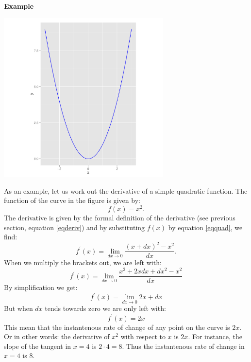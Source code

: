 \documentclass[a4paper]{report}
\begin{document}
\begin{mdframed}[backgroundcolor=exampcol]
\textbf{Example}\\
\begin{center}
\includegraphics[width=0.65\textwidth]{der_graphquad.pdf}\\
\end{center}
As an example, let us work out the derivative of a simple quadratic function. The function of the curve in the figure is given by: 
\begin{equation}
f(x)=x^2.
\label{eqquad}
\end{equation}
The derivative is given by the formal definition of the derivative (see previous section, equation \ref{eqderiv}) and by substituting $f(x)$ by equation \ref{eqquad}, we find:
\begin{equation}
f^\prime(x)=\lim\limits_{dx \to 0}\frac{(x+dx)^2-x^2}{dx}.
\end{equation}
When we multiply the brackets out, we are left with: 
\begin{equation}
f^\prime(x)=\lim\limits_{dx \to 0}\frac{x^2+2xdx+dx^2-x^2}{dx}
\end{equation}
By simplification we get:
\begin{equation} 
f^\prime(x)=\lim\limits_{dx \to 0}2x+dx
\end{equation}
But when $dx$ tends towards zero we are only left with:
\begin{equation}
f^\prime(x)=2x
\end{equation}
This mean that the instantenous rate of change of any point on the curve is $2x$. Or in other words: the derivative of $x^2$ with respect to $x$ is $2x$. For instance, the slope of the tangent in $x=4$ is $2 \cdot 4=8$. Thus the instantenous rate of change in $x=4$ is $8$.
\end{mdframed}
\end{document}
